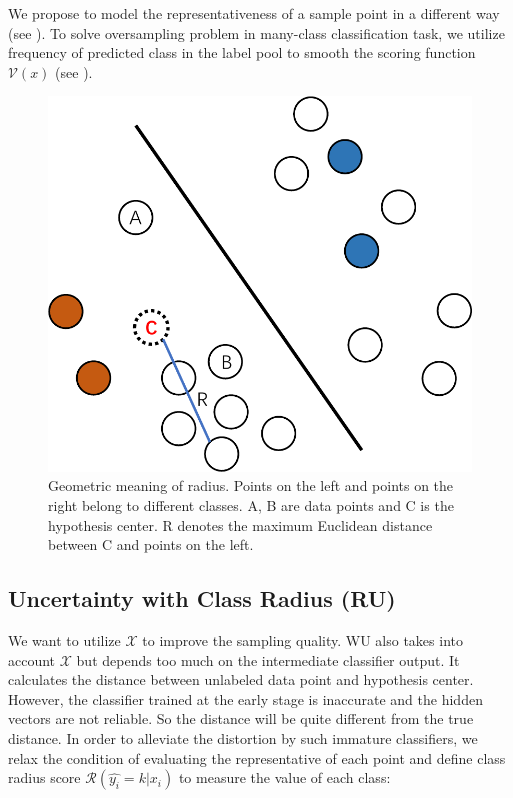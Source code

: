 We propose to model the representativeness of a sample
point in a different way (see ). To solve oversampling problem in many-class classification task, we utilize frequency of predicted class in the label pool to smooth the scoring function $\mathcal{V}(x)$ (see ).

\begin{figure}[th]
\centering
\scriptsize
\small
\setlength{\abovecaptionskip}{0pt}
\setlength{\belowcaptionskip}{0pt}
\includegraphics[scale=0.3]{figs/radius.pdf}
\caption{Geometric meaning of radius. Points on the left and points on the right
belong to different classes. A, B are data points and C is the hypothesis center. 
R denotes the maximum Euclidean distance between C and points on the left.}
\label{fig:radius}
\end{figure}

\subsection{Uncertainty with Class Radius (RU)}
\label{sec:classradius}
We want to utilize $\mathcal{X}$ to improve the sampling quality. 
WU also takes into account $\mathcal{X}$ but depends too much on the 
intermediate classifier output. It calculates the distance
between unlabeled data point and hypothesis center. 
However, the classifier trained at the early stage
is inaccurate and the hidden vectors are not reliable. 
So the distance will be quite different from the true distance. 
In order to alleviate the distortion by such immature classifiers, we relax the condition of evaluating the representative of each point and define class radius score $\mathcal{R}(\hat{y_i}=k|x_i)$ to measure the value of each class: 
    
